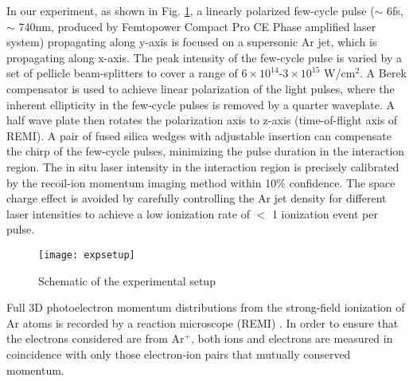 \documentclass[aps,prl,twocolumn,superscriptaddress,amsmath,amssymb]{revtex4-1}
\begin{document}
In our experiment, as shown in Fig. \ref{fig:expsetup}, a linearly polarized few-cycle pulse ($\sim$ 6fs, $\sim$ 740nm, produced by Femtopower Compact Pro CE Phase amplified laser system) propagating along y-axis is focused on a supersonic Ar jet, which is propagating along x-axis. The peak intensity of the few-cycle pulse is varied by a set of pellicle beam-splitters to cover a range of $6\times 10^{14}$-$3\times 10^{15}$ W/cm$^{2}$. A Berek compensator is used to achieve linear polarization of the light pulses, where the inherent ellipticity in the few-cycle pulses is removed by a quarter waveplate. A half wave plate then rotates the polarization axis to z-axis (time-of-flight axis of REMI). A pair of fused silica wedges with adjustable insertion can compensate the chirp of the  few-cycle pulses, minimizing the pulse duration in the interaction region. The in situ laser intensity in the interaction region is precisely calibrated by the recoil-ion momentum imaging method \cite{Smeenk2011a,Alnaser2004} within 10\% confidence. The space charge effect is avoided by carefully controlling the Ar jet density for different laser intensities to achieve a low ionization rate of $<$ 1 ionization event per pulse.
\begin{figure}[h!]
\texttt{[image: expsetup]}%
\caption{\label{fig:expsetup}}Schematic of the experimental setup
\end{figure}

Full 3D photoelectron momentum distributions from the strong-field ionization of Ar atoms is recorded by a reaction microscope (REMI) \cite{ullrich2003}. In order to ensure that the electrons considered are from Ar$^{+}$, both ions and electrons are measured in coincidence with only those electron-ion pairs that mutually conserved momentum.
 
\end{document}
